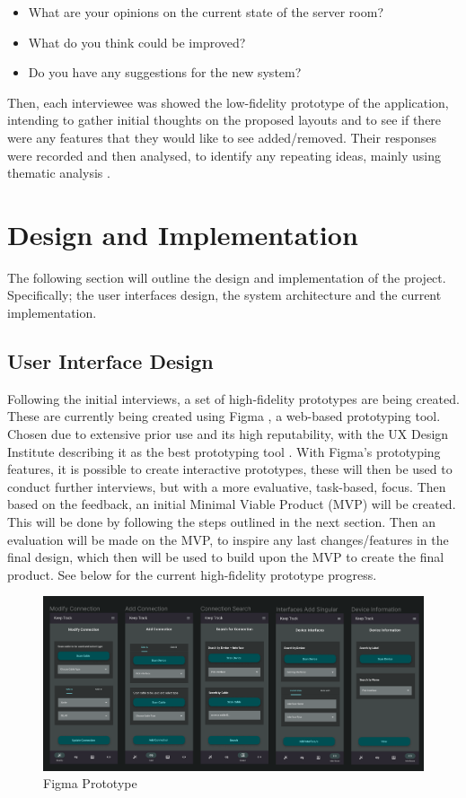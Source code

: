 \documentclass [11pt,a4paper]{article}
\begin{document}
\begin{itemize}
    \item What are your opinions on the current state of the server room?
    \item What do you think could be improved?
    \item Do you have any suggestions for the new system?
\end{itemize}

Then, each interviewee was showed the low-fidelity prototype of the application, intending to gather initial thoughts on the proposed layouts and to see if there were any features that they would like to see added/removed. Their responses were recorded and then analysed, to identify any repeating ideas, mainly using thematic analysis \cite{thematicAnal}.

\section{Design and Implementation}
\label{sec:design}
The following section will outline the design and implementation of the project. Specifically; the user interfaces design, the system architecture and the current implementation.

\subsection{User Interface Design}
\label{sec:ui_design}
Following the initial interviews, a set of high-fidelity prototypes are being created. These are currently being created using Figma \cite{figma}, a web-based prototyping tool. Chosen due to extensive prior use and its high reputability, with the UX Design Institute describing it as the best prototyping tool \cite{figmaUX}. With Figma's prototyping features, it is possible to create interactive prototypes, these will then be used to conduct further interviews, but with a more evaluative, task-based, focus. Then based on the feedback, an initial Minimal Viable Product (MVP) will be created. This will be done by following the steps outlined in the next section. Then an evaluation will be made on the MVP, to inspire any last changes/features in the final design, which then will be used to build upon the MVP to create the final product. See below for the current high-fidelity prototype progress.

\begin{figure}[H]
    \centering
    \includegraphics[width=1\textwidth]{images/figma_prototype.png}
    \caption{Figma Prototype}
    \label{fig:figma}
\end{figure}
\end{document}
